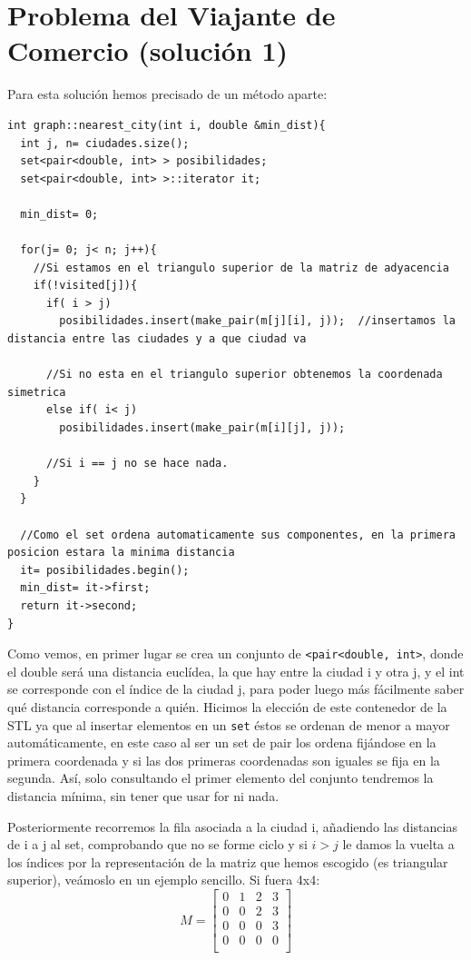\documentclass[11pt]{article}
\begin{document}
\section{Problema del Viajante de Comercio (solución 1)}
Para esta solución hemos precisado de un método aparte:
\begin{lstlisting}
int graph::nearest_city(int i, double &min_dist){
  int j, n= ciudades.size();
  set<pair<double, int> > posibilidades;
  set<pair<double, int> >::iterator it;

  min_dist= 0;

  for(j= 0; j< n; j++){
    //Si estamos en el triangulo superior de la matriz de adyacencia
    if(!visited[j]){
      if( i > j)
        posibilidades.insert(make_pair(m[j][i], j));  //insertamos la distancia entre las ciudades y a que ciudad va

      //Si no esta en el triangulo superior obtenemos la coordenada simetrica
      else if( i< j)
        posibilidades.insert(make_pair(m[i][j], j));

      //Si i == j no se hace nada.
    }
  }

  //Como el set ordena automaticamente sus componentes, en la primera posicion estara la minima distancia
  it= posibilidades.begin();
  min_dist= it->first;
  return it->second;
}
\end{lstlisting}
Como vemos, en primer lugar se crea un conjunto de \verb|<pair<double, int>|, donde el double será una distancia euclídea, la que hay entre la ciudad i y otra j, y el int se corresponde con el índice de la ciudad j, para poder luego más fácilmente saber qué distancia corresponde a quién. Hicimos la elección de este contenedor de la STL ya que al insertar elementos en un \verb|set| éstos se ordenan de menor a mayor automáticamente, en este caso al ser un set de pair los ordena fijándose en la primera coordenada y si las dos primeras coordenadas son iguales se fija en la segunda. Así, solo consultando el primer elemento del conjunto tendremos la distancia mínima, sin tener que usar for ni nada.

Posteriormente recorremos la fila asociada a la ciudad i, añadiendo las distancias de i a j al set, comprobando que no se forme ciclo y si $i>j$ le damos la vuelta a los índices por la representación de la matriz que hemos escogido (es triangular superior), veámoslo en un ejemplo sencillo. Si fuera 4x4: 
\[
   M=
  \left[ {\begin{array}{cccc}
   0 & 1 & 2 & 3 \\
   0 & 0 & 2 & 3 \\
   0 & 0 & 0 & 3 \\
   0 & 0 & 0 & 0 \\
  \end{array} } \right]
\]
\end{document}
